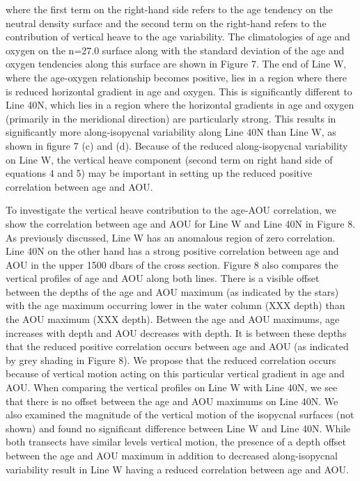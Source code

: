 where the first term on the right-hand side refers to the age tendency on the neutral density surface and the second term on the right-hand refers to the contribution of vertical heave to the age variability. The climatologies of age and oxygen on the n=27.0 surface along with the standard deviation of the age and oxygen tendencies along this surface are shown in Figure 7. The end of Line W, where the age-oxygen relationship becomes positive, lies in a region where there is reduced horizontal gradient in age and oxygen. This is significantly different to Line 40N, which lies in a region where the horizontal gradients in age and oxygen (primarily in the meridional direction) are particularly strong. This results in significantly more along-isopycnal variability along Line 40N than Line W, as shown in figure 7 (c) and (d). Because of the reduced along-isopycnal variability on Line W, the vertical heave component (second term on right hand side of equations 4 and 5) may be important in setting up the reduced positive correlation between age and AOU.

To investigate the vertical heave contribution to the age-AOU correlation, we show the correlation between age and AOU for Line W and Line 40N in Figure 8. As previously discussed, Line W has an anomalous region of zero correlation. Line 40N on the other hand has a strong positive correlation between age and AOU in the upper 1500 dbars of the cross section. Figure 8 also compares the vertical profiles of age and AOU along both lines. There is a visible offset between the depths of the age and AOU maximum (as indicated by the stars) with the age maximum occurring lower in the water column (XXX depth) than the AOU maximum (XXX depth). Between the age and AOU maximums, age increases with depth and AOU decreases with depth. It is between these depths that the reduced positive correlation occurs between age and AOU (as indicated by grey shading in Figure 8). We propose that the reduced correlation occurs because of vertical motion acting on this particular vertical gradient in age and AOU. When comparing the vertical profiles on Line W with Line 40N, we see that there is no offset between the age and AOU maximums on Line 40N. We also examined the magnitude of the vertical motion of the isopycnal surfaces (not shown) and found no significant difference between Line W and Line 40N. While both transects have similar levels vertical motion, the presence of a depth offset between the age and AOU maximum in addition to decreased along-isopycnal variability result in Line W having a reduced correlation between age and AOU.


